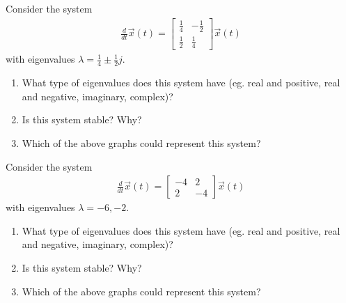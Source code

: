 \begin{enumerate}
    \qitem Consider the system
    \begin{align*}
        \frac{d}{dt} \vec{x}(t) = \begin{bmatrix}
            \frac{1}{4} & -\frac{1}{2} \\
            \frac{1}{2} & \frac{1}{4}
        \end{bmatrix} \vec{x}(t)
    \end{align*}
    with eigenvalues $\lambda = \frac{1}{4} \pm \frac{1}{2}j$.
    \begin{enumerate}
        \item What type of eigenvalues does this system have (eg. real and positive, real and negative, imaginary, complex)?
        \item Is this system stable? Why?
        \item Which of the above graphs could represent this system?
    \end{enumerate}

    \qitem Consider the system
    \begin{align*}
        \frac{d}{dt} \vec{x}(t) = \begin{bmatrix}
            -4 & 2 \\
             2 & -4
        \end{bmatrix} \vec{x}(t)
    \end{align*}
    with eigenvalues $\lambda = -6, -2$.
    \begin{enumerate}
        \item What type of eigenvalues does this system have (eg. real and positive, real and negative, imaginary, complex)?
        \item Is this system stable? Why?
        \item Which of the above graphs could represent this system?
    \end{enumerate}
\end{enumerate}

